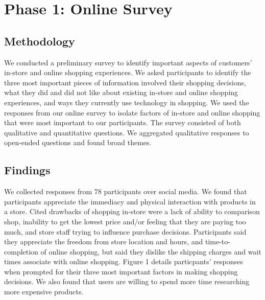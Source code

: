 \section{Phase 1: Online Survey}
\subsection{Methodology}
We conducted a preliminary survey to identify important aspects of customers' in-store and online shopping experiences. We asked participants to identify the three most important pieces of information involved their shopping decisions, what they did and did not like about existing in-store and online shopping experiences, and ways they currently use technology in shopping.   
We used the responses from our online survey to isolate factors of in-store and online shopping that were most important to our participants.  The survey consisted of both qualitative and quantitative questions.  We aggregated qualitative responses to open-ended questions and found broad themes.     

\subsection{Findings}
We collected responses from 78 participants over social media.  We found that participants appreciate the immediacy and physical interaction with products in a store.  Cited drawbacks of shopping in-store were a lack of ability to comparison shop, inability to get the lowest price and/or feeling that they are paying too much, and store staff trying to influence purchase decisions.  Participants said they appreciate the freedom from store location and hours, and time-to-completion of online shopping, but said they dislike the shipping charges and wait times associate with online shopping.  Figure 1  details particpants' responses when prompted for their three most important factors in making shopping decisions.  We also found that users are willing to spend more time researching more expensive products.